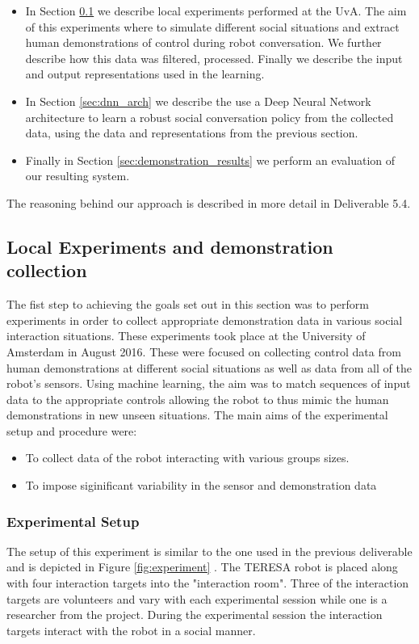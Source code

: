 \documentclass[a4paper,11pt]{report}
\begin{document}
\begin{itemize}
	\item In Section \ref{sec:demonstration_experiment} we describe local experiments performed at the UvA. The aim of this experiments where to simulate different social situations and extract human demonstrations of control during robot conversation. We further describe how this data was filtered, processed. Finally we describe the input and output representations used in the learning.
	\item In Section \ref{sec:dnn_arch} we describe the use a Deep Neural Network architecture to learn a robust social conversation policy from the collected data, using the data and representations from the previous section. 
	\item Finally in Section \ref{sec:demonstration_results} we perform an evaluation of our resulting system.
\end{itemize} 

The reasoning behind our approach is described in more detail in Deliverable 5.4. 

\subsection{Local Experiments and demonstration collection}
\label{sec:demonstration_experiment}
The fist step to achieving the goals set out in this section was to perform experiments in order to collect appropriate demonstration data in various social interaction situations. These experiments took place at the University of Amsterdam in August 2016. These were focused on collecting control data from human demonstrations at different social situations as well as data from all of the robot's sensors. Using machine learning, the aim was to match sequences of input data to the appropriate controls allowing the robot to thus mimic the human demonstrations in new unseen situations. The main aims of the experimental setup and procedure were:

\begin{itemize}
\item To collect data of the robot interacting with various groups sizes.
\item To impose siginificant variability in the sensor and demonstration data 
\end{itemize}

\subsubsection{Experimental Setup}
The setup of this experiment is similar to the one used in the previous deliverable and is depicted in Figure \ref{fig:experiment} . The TERESA robot is placed along with four interaction targets into the "interaction room". Three of the interaction targets are volunteers and vary with each experimental session while one is a researcher from the project. During the experimental session the interaction targets interact with the robot in a social manner. 
\end{document}

